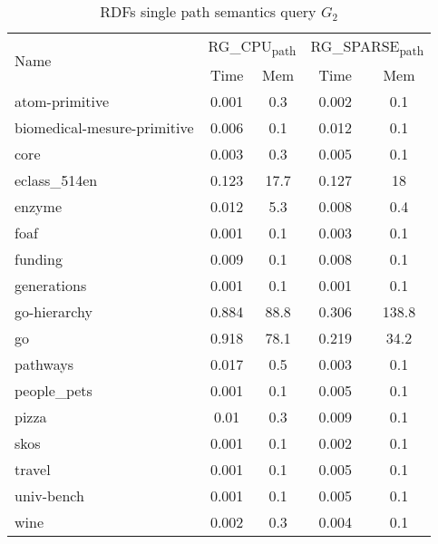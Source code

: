 {\setlength{\tabcolsep}{0.4em}
\begin{table*}[h]
\caption{RDFs single path semantics query $G_2$}
\label{tbl:tableRDFSinglePathIndexQ2}
\begin{tabular}{| l | c  c | c  c |}
    \hline
    \multirow{2}{*}{Name}	&	\multicolumn{2}{|c|}{RG\_CPU\textsubscript{path}}	&	\multicolumn{2}{|c|}{RG\_SPARSE\textsubscript{path}}	 \\
    		& Time & Mem &  Time     & Mem   \\    
    \hline
    \hline
    atom-primitive          & 0.001 & 0.3  & 0.002 & 0.1   \\
biomedical-mesure-primitive & 0.006 & 0.1  & 0.012 & 0.1   \\
core                        & 0.003 & 0.3  & 0.005 & 0.1   \\
eclass\_514en               & 0.123 & 17.7 & 0.127 & 18    \\
enzyme                      & 0.012 & 5.3  & 0.008 & 0.4   \\
foaf                        & 0.001 & 0.1  & 0.003 & 0.1   \\
funding                     & 0.009 & 0.1  & 0.008 & 0.1   \\
generations                 & 0.001 & 0.1  & 0.001 & 0.1   \\
go-hierarchy                & 0.884 & 88.8 & 0.306 & 138.8 \\
go                          & 0.918 & 78.1 & 0.219 & 34.2  \\
pathways                    & 0.017 & 0.5  & 0.003 & 0.1   \\
people\_pets                & 0.001 & 0.1  & 0.005 & 0.1   \\
pizza                       & 0.01  & 0.3  & 0.009 & 0.1   \\
skos                        & 0.001 & 0.1  & 0.002 & 0.1   \\
travel                      & 0.001 & 0.1  & 0.005 & 0.1   \\
univ-bench                  & 0.001 & 0.1  & 0.005 & 0.1   \\
wine                        & 0.002 & 0.3  & 0.004 & 0.1   \\
    \hline
  \end{tabular}
\end{table*}
}

